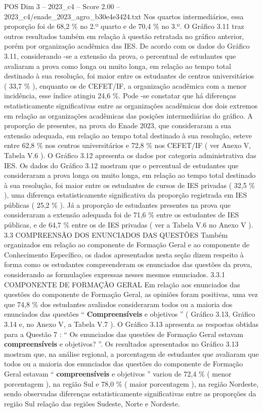 \begin{textsample}{POS Dim 3 – 2023\_c4 – Score 2.00 – 2023\_c4/enade\_2023\_agro\_b30e4e3424.txt}
Nos quartos intermediários, essa proporção foi de 68,2 \% no 2.º quarto e de 70,4 \% no 3.º.
O Gráfico 3.11 traz outros resultados também em relação à questão retratada no gráfico anterior, porém por organização acadêmica das IES.
De acordo com os dados do Gráfico 3.11, considerando -se a extensão da prova, o percentual de estudantes que avaliaram a prova como longa ou muito longa, em relação ao tempo total destinado à sua resolução, foi maior entre os estudantes de centros universitários ( 33,7 \% ), enquanto os de CEFET/IF, a organização acadêmica com a menor incidência, esse índice atingiu 24,6 \%.
Pode -se constatar que há diferenças estatisticamente significativas entre as organizações acadêmicas dos dois extremos em relação as organizações acadêmicas das posições intermediárias do gráfico.
A proporção de presentes, na prova do Enade 2023, que consideraram a sua extensão adequada, em relação ao tempo total destinado à sua resolução, esteve entre 62,8 \% nos centros universitários e 72,8 \% nos CEFET/IF ( ver Anexo V, Tabela V.6 ).
O Gráfico 3.12 apresenta os dados por categoria administrativa das IES.
Os dados do Gráfico 3.12 mostram que o percentual de estudantes que consideraram a prova longa ou muito longa, em relação ao tempo total destinado à sua resolução, foi maior entre os estudantes de cursos de IES privadas ( 32,5 \% ), uma diferença estatisticamente significativa da proporção registrada em IES públicas ( 25,2 \% ).
Já a proporção de estudantes presentes na prova que consideraram a extensão adequada foi de 71,6 \% entre os estudantes de IES públicas, e de 64,7 \% entre os de IES privadas ( ver a Tabela V.6 no Anexo V ). 3.3 COMPREENSÃO DOS ENUNCIADOS DAS QUESTÕES Também organizados em relação ao componente de Formação Geral e ao componente de Conhecimento Específico, os dados apresentados nesta seção dizem respeito à forma como os estudantes compreenderam os enunciados das questões da prova, considerando as formulações expressas nesses mesmos enunciados. 3.3.1 COMPONENTE DE FORMAÇÃO GERAL Em relação aos enunciados das questões do componente de Formação Geral, as opiniões foram positivas, uma vez que 74,8 \% dos estudantes avaliados consideraram todos ou a maioria dos enunciados das questões “ \textbf{Compreensíveis} e objetivos ” ( Gráfico 3.13, Gráfico 3.14 e, no Anexo V, a Tabela V.7 ).
O Gráfico 3.13 apresenta as respostas obtidas para a Questão 7 : “ Os enunciados das questões de Formação Geral estavam \textbf{compreensíveis} e objetivos? ”.
Os resultados apresentados no Gráfico 3.13 mostram que, na análise regional, a porcentagem de estudantes que avaliaram que todos ou a maioria dos enunciados das questões do componente de Formação Geral estavam “ \textbf{compreensíveis} e objetivos ” variou de 72,4 \% ( menor porcentagem ), na região Sul e 78,0 \% ( maior porcentagem ), na região Nordeste, sendo observadas diferenças estatisticamente significativas entre as proporções da região Sul relação das regiões Sudeste, Norte e Nordeste.

\end{textsample}

